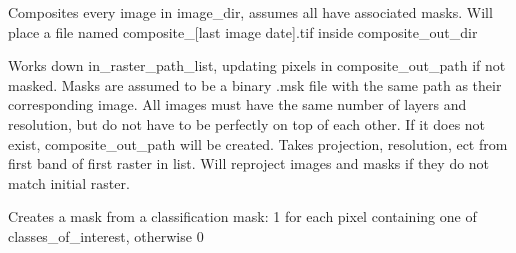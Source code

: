 \documentclass[letterpaper,10pt,english]{sphinxmanual}
\begin{document}

\begin{fulllineitems}
\label{\detokenize{index:pyeo.raster_manipulation.composite_directory}}
Composites every image in image\_dir, assumes all have associated masks.  Will
place a file named composite\_{[}last image date{]}.tif inside composite\_out\_dir

\end{fulllineitems}


\begin{fulllineitems}
\label{\detokenize{index:pyeo.raster_manipulation.composite_images_with_mask}}
Works down in\_raster\_path\_list, updating pixels in composite\_out\_path if not masked. Masks are assumed to
be a binary .msk file with the same path as their corresponding image. All images must have the same
number of layers and resolution, but do not have to be perfectly on top of each other. If it does not exist,
composite\_out\_path will be created. Takes projection, resolution, ect from first band of first raster in list.
Will reproject images and masks if they do not match initial raster.

\end{fulllineitems}


\begin{fulllineitems}
\label{\detokenize{index:pyeo.raster_manipulation.create_mask_from_class_map}}
Creates a mask from a classification mask: 1 for each pixel containing one of classes\_of\_interest, otherwise 0

\end{fulllineitems}
\end{document}
